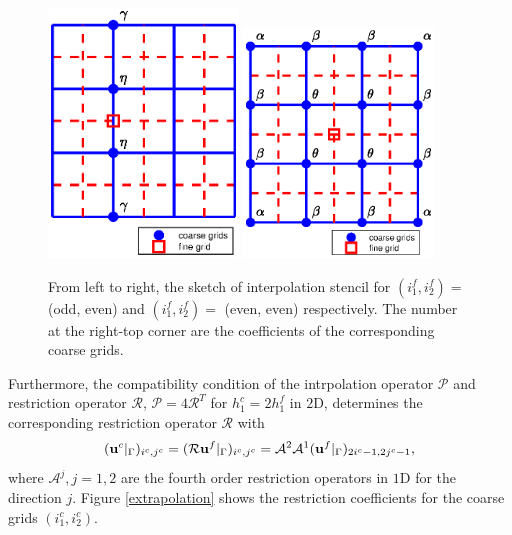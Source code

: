 \begin{figure}[htbp]
	\centering
	\includegraphics[width=0.45\textwidth]{interpolation3.eps}
	\includegraphics[width=0.45\textwidth]{interpolation4.eps}
	\caption{From left to right, the sketch of interpolation stencil for $(i_1^f,i_2^f) =$ (odd, even) and $(i_1^f,i_2^f) =$ (even, even) respectively. The number at the right-top corner are the coefficients of the corresponding coarse grids.}\label{interpolation_3_4}
\end{figure}

Furthermore, the compatibility condition of the intrpolation operator $\mathcal{P}$ and restriction operator $\mathcal{R}$, $\mathcal{P} = 4\mathcal{R}^T$ for $h_1^c = 2h_1^f$ in $2$D, determines the corresponding restriction operator $\mathcal{R}$ with
\begin{equation}\label{restriction}
({\bf u}^c|_{\Gamma})_{i^c,j^c} = (\mathcal{R}{\bf u}^f|_{\Gamma})_{i^c,j^c} = \mathcal{A}^2\mathcal{A}^1 ({\bf u}^f|_{\Gamma})_{2i^c-1,2j^c-1},
\end{equation}
where $\mathcal{A}^j, j = 1,2$ are the fourth order restriction operators in $1$D for the direction $j$. Figure \ref{extrapolation} shows the restriction coefficients for the coarse grids $(i_1^c,i_2^c)$.

